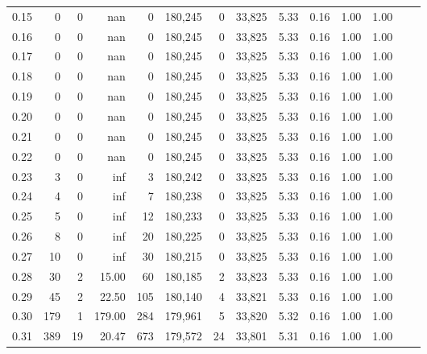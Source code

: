 \begin{tabular}{rrrrrrrrrrrrrr}
0.15 &       0 &      0 &     nan &        0 &  180,245 &       0 &  33,825 &  5.33 &  0.16 &  1.00 &      1.00 \\
0.16 &       0 &      0 &     nan &        0 &  180,245 &       0 &  33,825 &  5.33 &  0.16 &  1.00 &      1.00 \\
0.17 &       0 &      0 &     nan &        0 &  180,245 &       0 &  33,825 &  5.33 &  0.16 &  1.00 &      1.00 \\
0.18 &       0 &      0 &     nan &        0 &  180,245 &       0 &  33,825 &  5.33 &  0.16 &  1.00 &      1.00 \\
0.19 &       0 &      0 &     nan &        0 &  180,245 &       0 &  33,825 &  5.33 &  0.16 &  1.00 &      1.00 \\
0.20 &       0 &      0 &     nan &        0 &  180,245 &       0 &  33,825 &  5.33 &  0.16 &  1.00 &      1.00 \\
0.21 &       0 &      0 &     nan &        0 &  180,245 &       0 &  33,825 &  5.33 &  0.16 &  1.00 &      1.00 \\
0.22 &       0 &      0 &     nan &        0 &  180,245 &       0 &  33,825 &  5.33 &  0.16 &  1.00 &      1.00 \\
0.23 &       3 &      0 &     inf &        3 &  180,242 &       0 &  33,825 &  5.33 &  0.16 &  1.00 &      1.00 \\
0.24 &       4 &      0 &     inf &        7 &  180,238 &       0 &  33,825 &  5.33 &  0.16 &  1.00 &      1.00 \\
0.25 &       5 &      0 &     inf &       12 &  180,233 &       0 &  33,825 &  5.33 &  0.16 &  1.00 &      1.00 \\
0.26 &       8 &      0 &     inf &       20 &  180,225 &       0 &  33,825 &  5.33 &  0.16 &  1.00 &      1.00 \\
0.27 &      10 &      0 &     inf &       30 &  180,215 &       0 &  33,825 &  5.33 &  0.16 &  1.00 &      1.00 \\
0.28 &      30 &      2 &   15.00 &       60 &  180,185 &       2 &  33,823 &  5.33 &  0.16 &  1.00 &      1.00 \\
0.29 &      45 &      2 &   22.50 &      105 &  180,140 &       4 &  33,821 &  5.33 &  0.16 &  1.00 &      1.00 \\
0.30 &     179 &      1 &  179.00 &      284 &  179,961 &       5 &  33,820 &  5.32 &  0.16 &  1.00 &      1.00 \\
0.31 &     389 &     19 &   20.47 &      673 &  179,572 &      24 &  33,801 &  5.31 &  0.16 &  1.00 &      1.00 \\

\end{tabular}
